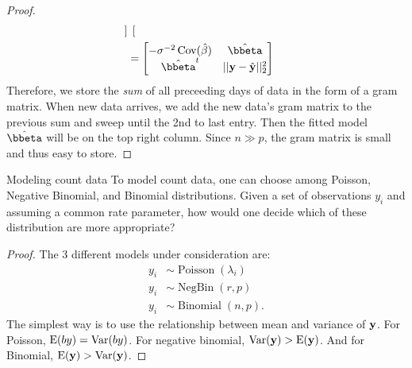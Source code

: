 \begin{proof}
\begin{align*}
\begin{bmatrix}
	\end{bmatrix}\\
	&= 
	\begin{bmatrix}
		-\sigma^{-2}\Cov(\hat{\beta}) & \hat{\bbeta}\\
		\hat{\bbeta}^t & ||\by - \hat{\by}||_2^2
	\end{bmatrix}
\end{align*}
Therefore, we store the \textit{sum} of all preceeding days of data in the form of a gram matrix. When new data arrives, we add the new data's gram matrix to the previous sum and sweep until the 2nd to last entry. Then the fitted model $\hat{\bbeta}$ will be on the top right column. Since $n \gg p$, the gram matrix is small and thus easy to store. 
\end{proof}

\begin{problembox}{Modeling count data \hfill {\small \cite[3.5.b]{dobson2008introduction}}}{}
To model count data, one can choose among Poisson, Negative Binomial, and Binomial distributions. Given a set of observations $y_i$ and assuming a common rate parameter, how would one decide which of these distribution are more appropriate?
\end{problembox}

\begin{proof}
The 3 different models under consideration are:
\begin{align*}
	y_i &\sim \operatorname{Poisson}(\lambda_i)\\
	y_i &\sim \operatorname{NegBin}(r, p)\\
	y_i &\sim \operatorname{Binomial}(n, p).
\end{align*}
The simplest way is to use the relationship between mean and variance of $\mathbf{y}$. For Poisson, $\mathop{\rm E\,\!}\nolimits(by) = \mathop{\rm Var}\nolimits(by)$. For negative binomial, $\mathop{\rm Var}\nolimits(\mathbf{y}) > \mathop{\rm E\,\!}\nolimits(\mathbf{y})$. And for Binomial, $\mathop{\rm E\,\!}\nolimits(\mathbf{y}) > \mathop{\rm Var}\nolimits(\mathbf{y})$. 

\end{proof}



